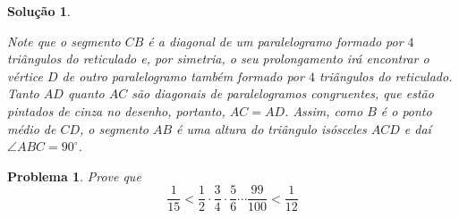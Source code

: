\documentclass{hipatia}
\newtheorem{problem*}{Problema}
\newtheorem*{solution*}{Solução}
\begin{document}
\begin{solution*}
\begin{center}

\end{center}	

\noindent  Note que o segmento $CB$ é a diagonal de um paralelogramo formado por $4$ triângulos do reticulado e, por simetria, o seu prolongamento irá encontrar o vértice $D$ de outro paralelogramo também formado por $4$ triângulos do reticulado. Tanto $AD$ quanto $AC$ são diagonais de paralelogramos congruentes, que estão pintados de cinza no desenho, portanto, $AC = AD$. Assim, como $B$ é o ponto médio de $CD$, o segmento $AB$ é uma altura do triângulo isósceles $ACD$ e daí $\angle ABC = 90^{\circ}$. 
\end{solution*}


\begin{problem*}
Prove que $$\frac{1}{15} < \frac{1}{2}\cdot \frac{3}{4} \cdot \frac{5}{6} \cdots \frac{99}{100} < \frac{1}{12}$$
	
\end{problem*}
\end{document}
